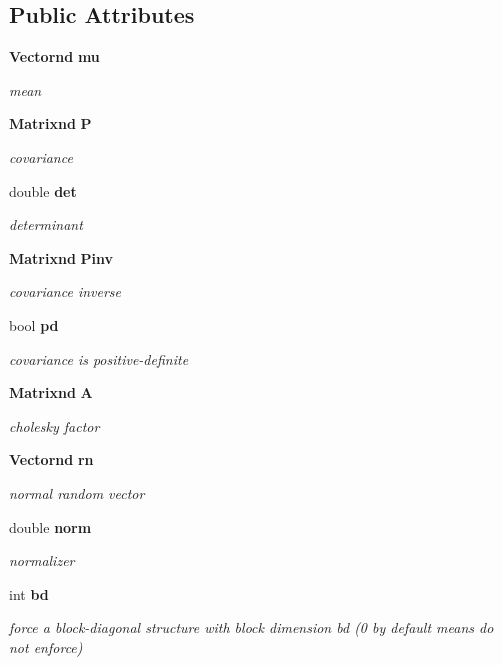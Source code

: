 \subsection*{\-Public \-Attributes}
\begin{DoxyCompactItemize}
\item 
{\bf \-Vectornd} {\bf mu}
\begin{DoxyCompactList}\small\item\em mean \end{DoxyCompactList}\item 
{\bf \-Matrixnd} {\bf \-P}
\begin{DoxyCompactList}\small\item\em covariance \end{DoxyCompactList}\item 
double {\bf det}
\begin{DoxyCompactList}\small\item\em determinant \end{DoxyCompactList}\item 
{\bf \-Matrixnd} {\bf \-Pinv}
\begin{DoxyCompactList}\small\item\em covariance inverse \end{DoxyCompactList}\item 
bool {\bf pd}
\begin{DoxyCompactList}\small\item\em covariance is positive-\/definite \end{DoxyCompactList}\item 
{\bf \-Matrixnd} {\bf \-A}
\begin{DoxyCompactList}\small\item\em cholesky factor \end{DoxyCompactList}\item 
{\bf \-Vectornd} {\bf rn}
\begin{DoxyCompactList}\small\item\em normal random vector \end{DoxyCompactList}\item 
double {\bf norm}
\begin{DoxyCompactList}\small\item\em normalizer \end{DoxyCompactList}\item 
int {\bf bd}
\begin{DoxyCompactList}\small\item\em force a block-\/diagonal structure with block dimension bd (0 by default means do not enforce) \end{DoxyCompactList}\item 

\end{DoxyCompactItemize}
